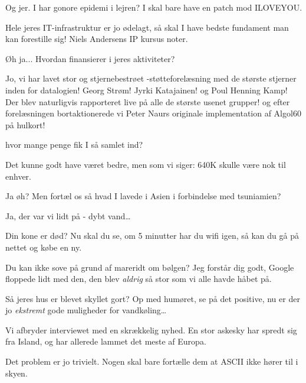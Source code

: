 \documentclass[a4paper,11pt]{article}
\begin{document}
\begin{sketch}
  Og jer. I har gonore epidemi i lejren? 
 I skal bare have en patch mod ILOVEYOU. 

  Hele jeres IT-infrastruktur er jo ødelagt, så skal I have bedste fundament man kan forestille sig! Niels Andersens IP kursus noter. 

 Øh ja...
 Hvordan finansierer i jeres aktiviteter?


 Jo, vi har lavet stor og stjernebestrøet -støtteforelæsning med de største stjerner inden for datalogien! Georg Strøm! Jyrki Katajainen! og Poul Henning Kamp! 
Der blev naturligvis rapporteret live på alle de største usenet grupper!
 og efter forelæsningen bortaktionerede vi Peter Naurs originale implementation af Algol60 på hulkort!

 hvor mange penge fik I så samlet ind?

 Det kunne godt have været bedre, men som vi siger: 640K skulle  være nok til enhver.

 Ja øh? Men fortæl os så hvad I lavede i Asien i forbindelse med tsuniamien?

 Ja, der var vi lidt på  - dybt vand\ldots



  Din kone er død?
 Nu skal du se, om 5 minutter har du wifi igen, så kan du gå på nettet og købe en ny.

  Du kan ikke sove på grund af mareridt om bølgen? 
 Jeg forstår dig godt, Google floppede lidt med den, den blev \emph{aldrig} så stor som vi alle havde håbet på.

  Så jeres hus er blevet skyllet gort? 
 Op med humøret, se på det positive, nu er der jo \emph{ekstremt} gode muligheder for vandkøling\dots

 Vi afbryder interviewet med en skrækkelig nyhed. En stor askesky har spredt sig fra Island, og har allerede lammet det meste af Europa.

  Det problem er jo trivielt. Nogen skal bare fortælle dem at ASCII ikke hører til i skyen.

\end{sketch}
\end{document}
